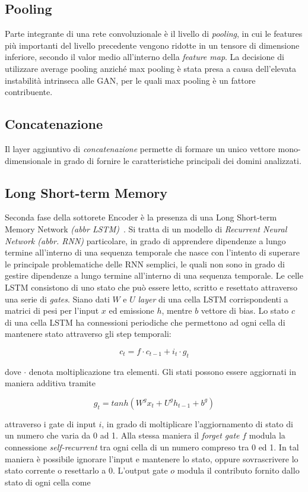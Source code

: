 \subsection{Pooling}
Parte integrante di una rete convoluzionale è il livello di \textit{pooling}, in cui le features più importanti del livello precedente vengono ridotte in un tensore di dimensione inferiore, secondo il valor medio all'interno della \textit{feature map}. La decisione di utilizzare average pooling anziché max pooling è stata presa a causa dell'elevata instabilità intrinseca alle GAN, per le quali max pooling è un fattore contribuente. 

\subsection{Concatenazione}
Il layer aggiuntivo di \textit{concatenazione} permette di formare un unico vettore mono-dimensionale in grado di fornire le caratteristiche principali dei domini analizzati.

\subsection{Long Short-term Memory}
Seconda fase della sottorete Encoder è la presenza di una Long Short-term Memory Network \textit{(abbr LSTM)}~\cite{LSTM}. Si tratta di un modello di \textit{Recurrent Neural Network (abbr. RNN)} particolare, in grado di apprendere dipendenze a lungo termine all'interno di una sequenza temporale che nasce con l'intento di superare le principale problematiche delle RNN semplici, le quali non sono in grado di gestire dipendenze a lungo termine all'interno di una sequenza temporale. Le celle LSTM consistono di uno stato che può essere letto, scritto e resettato attraverso una serie di \textit{gates}. Siano dati $W$ e $U$ \textit{layer} di una cella LSTM corrispondenti a matrici di pesi per l'input $x$ ed emissione $h$, mentre $b$ vettore di bias. Lo stato $c$ di una cella LSTM ha connessioni periodiche che permettono ad ogni cella di mantenere stato attraverso gli step temporali:

\[c_t = f \cdot c_{t-1} + i_t \cdot g_t\]

dove $\cdot$ denota moltiplicazione tra elementi. Gli stati possono essere aggiornati in maniera additiva tramite

\[g_t = tanh(W^gx_t + U^gh_{t-1}+b^g)\]


attraverso i gate di input $i$, in grado di moltiplicare l'aggiornamento di stato di un numero che varia da 0 ad 1. Alla stessa maniera il \textit{forget gate} $f$ modula la connessione \textit{self-recurrent} tra ogni cella di un numero compreso tra 0 ed 1. In tal maniera è possibile ignorare l'input e mantenere lo stato, oppure sovrascrivere lo stato corrente o resettarlo a 0.
L'output gate $o$ modula il contributo fornito dallo stato di ogni cella come

